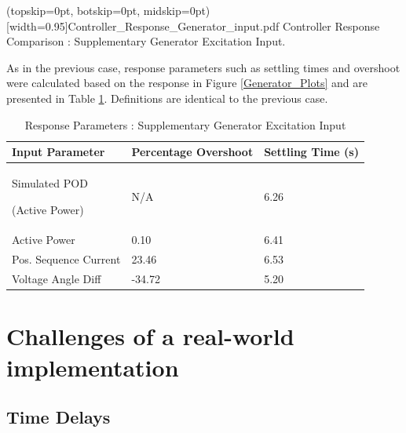 \documentclass{ieeeaccess}
\begin{document}
\Figure[tbp!](topskip=0pt, botskip=0pt, midskip=0pt)[width=0.95\columnwidth]{Controller_Response_Generator_input.pdf}
{Controller Response Comparison : Supplementary Generator Excitation Input.\label{Generator_Plots}}

As in the previous case, response parameters such as settling times and overshoot were calculated based on the response in Figure \ref{Generator_Plots} and are presented in Table \ref{GENResponseTable}. Definitions are identical to the previous case.

\begin{table}[!ht]
\caption{Response Parameters : Supplementary Generator Excitation Input}\label{GENResponseTable}
\begin{center}
\begin{tabular}{|p{80pt}|p{60pt}|p{60pt}|}
\hline \textbf{Input Parameter} & \textbf{Percentage Overshoot} & \textbf{Settling Time (s)} \\
\hline Simulated POD \par (Active Power) & N/A & 6.26\\ 
\hline Active Power & 0.10 & 6.41\\ 
\hline Pos. Sequence Current & 23.46 & 6.53 \\ 
\hline Voltage Angle Diff & -34.72 & 5.20 \\ 
\hline 
\end{tabular}
\end{center}
\end{table}

\section{Challenges of a real-world implementation}\label{Challenges}

\subsection{Time Delays}
\end{document}
